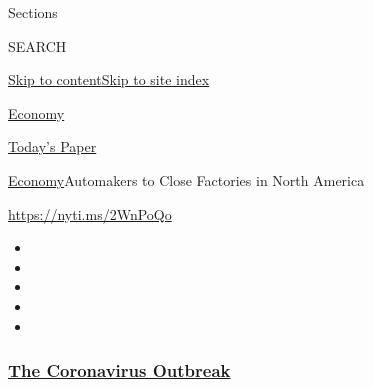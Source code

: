 Sections

SEARCH

\protect\hyperlink{site-content}{Skip to
content}\protect\hyperlink{site-index}{Skip to site index}

\href{https://www.nytimes3xbfgragh.onion/section/business/economy}{Economy}

\href{https://myaccount.nytimes3xbfgragh.onion/auth/login?response_type=cookie\&client_id=vi}{}

\href{https://www.nytimes3xbfgragh.onion/section/todayspaper}{Today's
Paper}

\href{/section/business/economy}{Economy}\textbar{}Automakers to Close
Factories in North America

\url{https://nyti.ms/2WnPoQo}

\begin{itemize}
\item
\item
\item
\item
\item
\end{itemize}

\hypertarget{the-coronavirus-outbreak}{%
\subsubsection{\texorpdfstring{\href{https://www.nytimes3xbfgragh.onion/news-event/coronavirus?name=styln-coronavirus-markets\&region=TOP_BANNER\&block=storyline_menu_recirc\&action=click\&pgtype=Article\&impression_id=4207e120-f1c7-11ea-92a1-2bd7040d46f7\&variant=undefined}{The
Coronavirus
Outbreak}}{The Coronavirus Outbreak}}\label{the-coronavirus-outbreak}}

